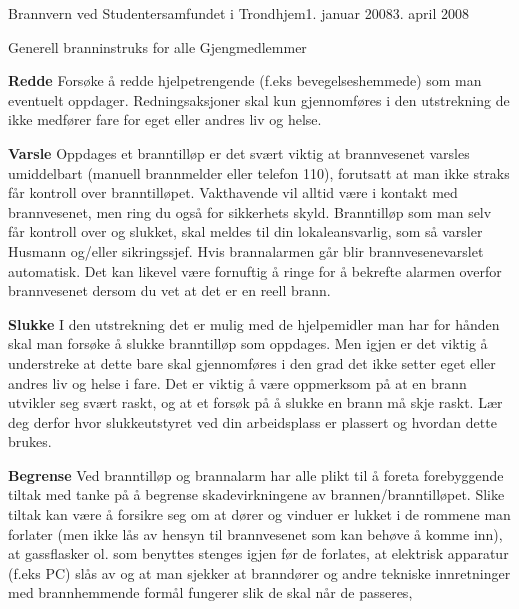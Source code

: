 \begin{instruks}{Brannvern ved Studentersamfundet i Trondhjem}{1. januar 2008}{3. april 2008}
\begin{instruksledd}{Generell branninstruks for alle Gjengmedlemmer}
        \begin{description}
            \item \textbf{Redde} Forsøke å redde hjelpetrengende (f.eks bevegelseshemmede) som man
                eventuelt oppdager. Redningsaksjoner skal kun
                gjennomføres i den utstrekning de ikke medfører fare for eget eller andres liv
                og helse.
            \item \textbf{Varsle} Oppdages et branntilløp er det svært viktig at brannvesenet varsles
                umiddelbart (manuell brannmelder eller telefon
                110), forutsatt at man ikke straks får kontroll over branntilløpet.
                Vakthavende vil alltid være i kontakt med
                brannvesenet, men ring du også for sikkerhets skyld. Branntilløp som man selv
                får kontroll over og slukket, skal
                meldes til din lokaleansvarlig, som så varsler Husmann og/eller sikringssjef.
                Hvis brannalarmen går blir brannvesenevarslet automatisk. Det kan likevel være
                fornuftig å ringe for å bekrefte alarmen overfor brannvesenet dersom du vet
                at det er en reell brann.
            \item \textbf{Slukke} I den utstrekning det er mulig med de hjelpemidler man har for hånden skal man
                forsøke å slukke branntilløp som
                oppdages. Men igjen er det viktig å understreke at dette bare skal
                gjennomføres i den grad det ikke setter eget eller
                andres liv og helse i fare. Det er viktig å være oppmerksom på at en brann
                utvikler seg svært raskt, og at et forsøk på å
                slukke en brann må skje raskt. Lær deg derfor hvor slukkeutstyret ved din
                arbeidsplass er plassert og hvordan dette
                brukes.
            \item \textbf{Begrense} Ved branntilløp og brannalarm har alle plikt til å foreta
                forebyggende tiltak med tanke på å begrense skadevirkningene
                av brannen/branntilløpet. Slike tiltak kan være å forsikre seg om at dører og
                vinduer er lukket i de rommene man
                forlater (men ikke lås av hensyn til brannvesenet som kan behøve å komme inn),
                at gassflasker ol. som benyttes
                stenges igjen før de forlates, at elektrisk apparatur (f.eks PC) slås av og at
                man sjekker at branndører og andre tekniske
                innretninger med brannhemmende formål fungerer slik de skal når de passeres,

\end{description}
\end{instruksledd}
\end{instruks}

